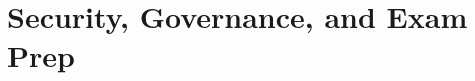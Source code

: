 \documentclass[11pt,a4paper,oneside]{book}
\begin{document}
\part{Security, Governance, and Exam Prep}





\appendix








\backmatter



\printindex
\end{document}

